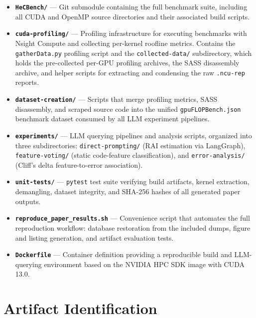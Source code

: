 \documentclass[conference]{IEEEtran}
\begin{document}
\begin{itemize}
    \item \textbf{\texttt{HeCBench/}} --- Git submodule containing the full \hecbench benchmark suite, including all CUDA and OpenMP source directories and their associated build scripts.

    \item \textbf{\texttt{cuda-profiling/}} --- Profiling infrastructure for executing benchmarks with Nsight Compute and collecting per-kernel roofline metrics.
    Contains the \texttt{gatherData.py} profiling script and the \texttt{collected-data/} subdirectory, which holds the pre-collected per-GPU profiling archives, the SASS disassembly archive, and helper scripts for extracting and condensing the raw \texttt{.ncu-rep} reports.

    \item \textbf{\texttt{dataset-creation/}} --- Scripts that merge profiling metrics, SASS disassembly, and scraped source code into the unified \texttt{gpuFLOPBench.json} benchmark dataset consumed by all LLM experiment pipelines.

    \item \textbf{\texttt{experiments/}} --- LLM querying pipelines and analysis scripts, organized into three subdirectories: \texttt{direct-prompting/} (RAI estimation via LangGraph), \texttt{feature-voting/} (static code-feature classification), and \texttt{error-analysis/} (Cliff's delta feature-to-error association).

    \item \textbf{\texttt{unit-tests/}} --- \texttt{pytest} test suite verifying build artifacts, kernel extraction, demangling, dataset integrity, and SHA-256 hashes of all generated paper outputs.

    \item \textbf{\texttt{reproduce\_paper\_results.sh}} --- Convenience script that automates the full reproduction workflow: database restoration from the included dumps, figure and listing generation, and artifact evaluation tests.

    \item \textbf{\texttt{Dockerfile}} --- Container definition providing a reproducible build and LLM-querying environment based on the NVIDIA HPC SDK image with CUDA 13.0.
\end{itemize}

\section{Artifact Identification}
\end{document}
